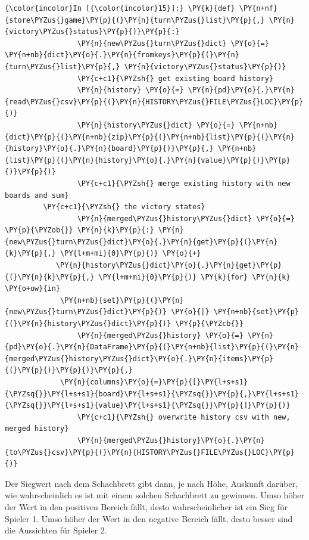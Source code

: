     \begin{Verbatim}[commandchars=\\\{\}]
{\color{incolor}In [{\color{incolor}15}]:} \PY{k}{def} \PY{n+nf}{store\PYZus{}game}\PY{p}{(}\PY{n}{turn\PYZus{}list}\PY{p}{,} \PY{n}{victory\PYZus{}status}\PY{p}{)}\PY{p}{:}
                 \PY{n}{new\PYZus{}turn\PYZus{}dict} \PY{o}{=} \PY{n+nb}{dict}\PY{o}{.}\PY{n}{fromkeys}\PY{p}{(}\PY{n}{turn\PYZus{}list}\PY{p}{,} \PY{n}{victory\PYZus{}status}\PY{p}{)}
                 \PY{c+c1}{\PYZsh{} get existing board history}
                 \PY{n}{history} \PY{o}{=} \PY{n}{pd}\PY{o}{.}\PY{n}{read\PYZus{}csv}\PY{p}{(}\PY{n}{HISTORY\PYZus{}FILE\PYZus{}LOC}\PY{p}{)}
                 \PY{n}{history\PYZus{}dict} \PY{o}{=} \PY{n+nb}{dict}\PY{p}{(}\PY{n+nb}{zip}\PY{p}{(}\PY{n+nb}{list}\PY{p}{(}\PY{n}{history}\PY{o}{.}\PY{n}{board}\PY{p}{)}\PY{p}{,} \PY{n+nb}{list}\PY{p}{(}\PY{n}{history}\PY{o}{.}\PY{n}{value}\PY{p}{)}\PY{p}{)}\PY{p}{)}
                 \PY{c+c1}{\PYZsh{} merge existing history with new boards and sum} 
		 \PY{c+c1}{\PYZsh{} the victory states}
                 \PY{n}{merged\PYZus{}history\PYZus{}dict} \PY{o}{=} \PY{p}{\PYZob{}} \PY{n}{k}\PY{p}{:} \PY{n}{new\PYZus{}turn\PYZus{}dict}\PY{o}{.}\PY{n}{get}\PY{p}{(}\PY{n}{k}\PY{p}{,} \PY{l+m+mi}{0}\PY{p}{)} \PY{o}{+}
 			\PY{n}{history\PYZus{}dict}\PY{o}{.}\PY{n}{get}\PY{p}{(}\PY{n}{k}\PY{p}{,} \PY{l+m+mi}{0}\PY{p}{)} \PY{k}{for} \PY{n}{k} \PY{o+ow}{in} 
			 \PY{n+nb}{set}\PY{p}{(}\PY{n}{new\PYZus{}turn\PYZus{}dict}\PY{p}{)} \PY{o}{|} \PY{n+nb}{set}\PY{p}{(}\PY{n}{history\PYZus{}dict}\PY{p}{)} \PY{p}{\PYZcb{}}
                 \PY{n}{merged\PYZus{}history} \PY{o}{=} \PY{n}{pd}\PY{o}{.}\PY{n}{DataFrame}\PY{p}{(}\PY{n+nb}{list}\PY{p}{(}\PY{n}{merged\PYZus{}history\PYZus{}dict}\PY{o}{.}\PY{n}{items}\PY{p}{(}\PY{p}{)}\PY{p}{)}\PY{p}{,} 
			 \PY{n}{columns}\PY{o}{=}\PY{p}{[}\PY{l+s+s1}{\PYZsq{}}\PY{l+s+s1}{board}\PY{l+s+s1}{\PYZsq{}}\PY{p}{,}\PY{l+s+s1}{\PYZsq{}}\PY{l+s+s1}{value}\PY{l+s+s1}{\PYZsq{}}\PY{p}{]}\PY{p}{)}
                 \PY{c+c1}{\PYZsh{} overwrite history csv with new, merged history}
                 \PY{n}{merged\PYZus{}history}\PY{o}{.}\PY{n}{to\PYZus{}csv}\PY{p}{(}\PY{n}{HISTORY\PYZus{}FILE\PYZus{}LOC}\PY{p}{)}
\end{Verbatim}


    Der Siegwert nach dem Schachbrett gibt dann, je nach Höhe, Auskunft
darüber, wie wahrscheinlich es ist mit einem solchen Schachbrett zu
gewinnen. Umso höher der Wert in den positiven Bereich fällt, desto
wahrscheinlicher ist ein Sieg für Spieler 1. Umso höher der Wert in den
negative Bereich fällt, desto besser sind die Aussichten für Spieler 2.

